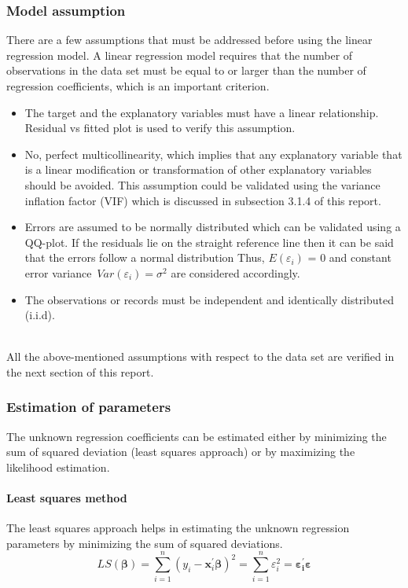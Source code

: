 \documentclass[12 pt]{scrartcl}
\begin{document}
\subsubsection{Model assumption}

There are a few assumptions that must be addressed before using the linear regression model. A linear regression model requires that the number of observations in the data set must be equal to or larger than the number of regression coefficients, which is an important criterion.

 \begin{itemize}
\item The target and the explanatory variables must have a linear relationship. Residual vs fitted plot is used to verify this assumption.
\item No, perfect multicollinearity, which implies that any explanatory variable that is a linear modification or transformation of other explanatory variables should be avoided. This assumption could be validated using the variance inflation factor (VIF) which is discussed in subsection 3.1.4 of this report.
\item Errors are assumed to be normally distributed which can be validated using a QQ-plot. If the residuals lie on the straight reference line then it can be said that the errors follow a normal distribution Thus, $E (\varepsilon_i)$ = 0 and constant error variance $\, Var (\varepsilon_i) = {\sigma}^2$ are considered accordingly.
\item The observations or records must be independent and identically distributed {(i.i.d)}.
\end{itemize}\citep[p.~75-76]{regression}\\
All the above-mentioned assumptions with respect to the data set are verified in the next section of this report.

\subsubsection{Estimation of parameters}

The unknown regression coefficients can be estimated either by minimizing the sum of squared deviation (least squares approach) or by maximizing the likelihood estimation. 
\paragraph{Least squares method}
The least squares approach helps in estimating the unknown regression parameters by minimizing the sum of squared deviations.
$$ LS(\boldsymbol{\beta}) = \sum_{i=1}^{n}(y_{i} - \mathbf{x}_{i}^\mathbf{'}\boldsymbol{\beta})^{2} = 
\sum_{i=1}^{n}\varepsilon_{i}^{2} = \boldsymbol{\varepsilon_{i}^{'}\varepsilon}
$$
\end{document}
